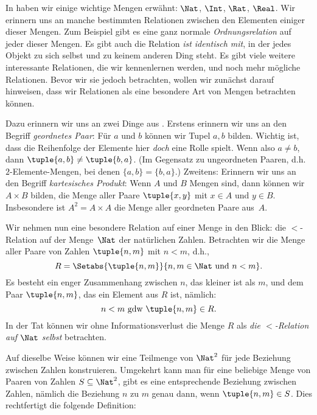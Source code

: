 \documentclass[../../../include/open-logic-section]{subfiles}
\begin{document}

\begin{explain}
In  haben wir einige wichtige Mengen erwähnt:
$\Nat$, $\Int$, $\Rat$, $\Real$. Wir erinnern uns an manche bestimmten Relationen
zwischen den Elementen einiger dieser Mengen.
Zum Beispiel gibt es eine ganz normale \emph{Ordnungsrelation} auf jeder dieser Mengen. 
Es gibt auch die Relation \emph{ist identisch mit},
in der jedes Objekt zu sich selbst und zu keinem anderen Ding steht. Es gibt
viele weitere interessante Relationen, die wir kennenlernen werden, und noch mehr
mögliche Relationen. Bevor wir sie jedoch betrachten, wollen wir zunächst
darauf hinweisen, dass wir Relationen als eine besondere Art von Mengen betrachten können. 
  
Dazu erinnern wir uns an zwei Dinge aus . Erstens
erinnern wir uns an den Begriff \emph{geordnetes Paar}: Für $a$ und $b$ können wir
Tupel ${a, b}$ bilden. Wichtig ist, dass die Reihenfolge der Elemente hier \emph{doch}
eine Rolle spielt. Wenn also $a \neq b$, dann $\tuple{a, b} \neq \tuple{b, a}$.
(Im Gegensatz zu ungeordneten Paaren, d.h. $2$-Elemente-Mengen, bei denen
$\{a, b\}=\{b, a\}$.) Zweitens: Erinnern wir uns an den Begriff \emph{kartesisches
Produkt}: Wenn $A$ und $B$ Mengen sind, dann können wir~$A \times B$ bilden, die
Menge aller Paare $\tuple{x, y}$ mit $x \in A$ und $y \in B$.
Insbesondere ist $A^{2}= A \times A$ die Menge aller geordneten Paare
aus~$A$.

Wir nehmen nun eine besondere Relation auf einer Menge in den Blick: die $<$-Relation
auf der Menge~$\Nat$ der natürlichen Zahlen. Betrachten wir die Menge aller Paare von
Zahlen $\tuple{n, m}$ mit $n<m$, d.h.,
\[
  R=\Setabs{\tuple{n, m}}{n, m \in \Nat \text{ und } n<m}.
\]
Es besteht ein enger Zusammenhang zwischen $n$, das kleiner ist als $m$, und dem
Paar $\tuple{n, m}$, das ein Element aus $R$ ist, nämlich:
\[
      n<m\text{ gdw }\tuple{n, m} \in R.
\]
In der Tat können wir ohne Informationsverlust die Menge $R$ als
\emph{die $<$-Relation auf $\Nat$ selbst} betrachten. 

Auf dieselbe Weise können wir eine Teilmenge von $\Nat^{2}$ für jede
Beziehung zwischen Zahlen konstruieren. Umgekehrt kann man für eine beliebige Menge von Paaren von
Zahlen $S \subseteq \Nat^{2}$, gibt es eine entsprechende Beziehung
zwischen Zahlen, nämlich die Beziehung $n$ zu $m$ genau dann, wenn $\tuple{n, m} \in S$.
Dies rechtfertigt die folgende Definition:
\end{explain}
  
\end{document}
